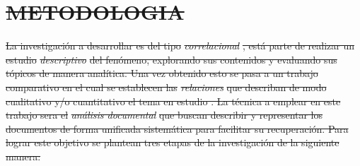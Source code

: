 \documentclass[12pt, letterpaper]{report}
\providecommand{\DIFdeltex}[1]{{\protect\color{red}\sout{#1}}}                      %
\providecommand{\DIFdel}[1]{\texorpdfstring{\DIFdeltex{#1}}{}} %
\begin{document}
\chapter{\DIFdel{METODOLOGIA}}
\addtocounter{chapter}{-1}%

\DIFdel{La investigación a desarrollar es del tipo }\textit{\DIFdel{correlacional}}%
\DIFdel{, está parte  de realizar un estudio }\emph{\DIFdel{descriptivo}} %
\DIFdel{del fenómeno,  explorando sus contenidos  y  evaluando  sus tópicos de manera analítica. Una vez obtenido  esto  se pasa a un trabajo comparativo  en el cual se establecen las    }\textit{\DIFdel{relaciones}} %
\DIFdel{que describan de modo cualitativo y/o cuantitativo  el tema en estudio . La técnica a emplear en este trabajo sera el }\textit{\DIFdel{análisis documental}} %
\DIFdel{que buscan describir y representar los documentos de forma unificada sistemática para facilitar su recuperación. 
Para lograr este objetivo se plantean tres etapas de la  investigación de la siguiente manera:}%
\end{document}
